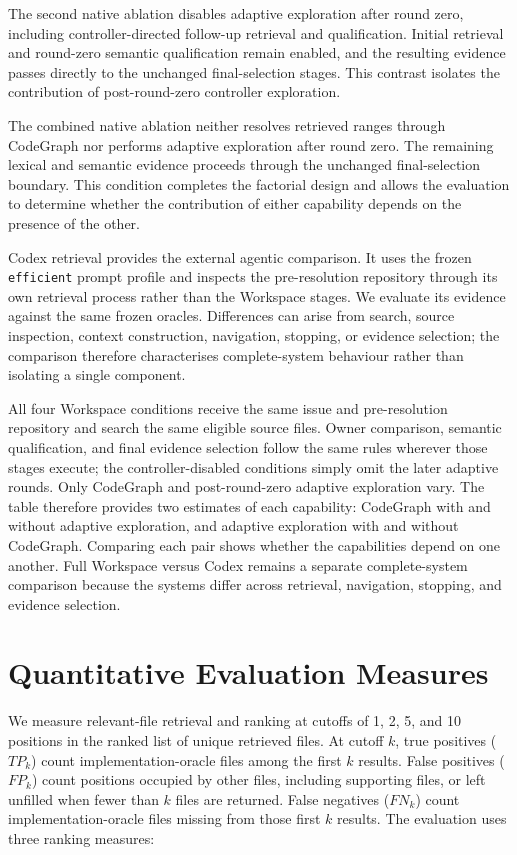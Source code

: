 The second native ablation disables adaptive exploration after round zero, including controller-directed follow-up retrieval and qualification. Initial retrieval and round-zero semantic qualification remain enabled, and the resulting evidence passes directly to the unchanged final-selection stages. This contrast isolates the contribution of post-round-zero controller exploration.

The combined native ablation neither resolves retrieved ranges through CodeGraph nor performs adaptive exploration after round zero. The remaining lexical and semantic evidence proceeds through the unchanged final-selection boundary. This condition completes the factorial design and allows the evaluation to determine whether the contribution of either capability depends on the presence of the other.

Codex retrieval provides the external agentic comparison. It uses the frozen \texttt{efficient} prompt profile and inspects the pre-resolution repository through its own retrieval process rather than the Workspace stages. We evaluate its evidence against the same frozen oracles. Differences can arise from search, source inspection, context construction, navigation, stopping, or evidence selection; the comparison therefore characterises complete-system behaviour rather than isolating a single component.

All four Workspace conditions receive the same issue and pre-resolution repository and search the same eligible source files. Owner comparison, semantic qualification, and final evidence selection follow the same rules wherever those stages execute; the controller-disabled conditions simply omit the later adaptive rounds. Only CodeGraph and post-round-zero adaptive exploration vary. The table therefore provides two estimates of each capability: CodeGraph with and without adaptive exploration, and adaptive exploration with and without CodeGraph. Comparing each pair shows whether the capabilities depend on one another. Full Workspace versus Codex remains a separate complete-system comparison because the systems differ across retrieval, navigation, stopping, and evidence selection.

\section{Quantitative Evaluation Measures}\label{sec:quantitative-evaluation-measures}

We measure relevant-file retrieval and ranking at cutoffs of 1, 2, 5, and 10 positions in the ranked list of unique retrieved files. At cutoff $k$, true positives ($TP_k$) count implementation-oracle files among the first $k$ results. False positives ($FP_k$) count positions occupied by other files, including supporting files, or left unfilled when fewer than $k$ files are returned. False negatives ($FN_k$) count implementation-oracle files missing from those first $k$ results. The evaluation uses three ranking measures:

